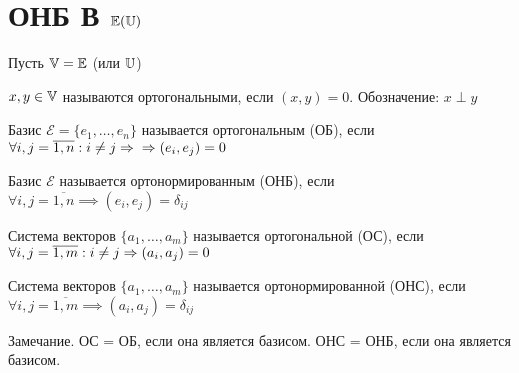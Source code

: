 \documentclass[../main.tex]{subfiles}
\begin{document}
    \section{ОНБ В $\E(\U)$}
Пусть $\V= \E $ (или $\U$)
\begin{definition}
    $x,y\in \V$ называются ортогональными, если $(x,y)= 0$. Обозначение: $x\perp y$
\end{definition}
\begin{definition}
    Базис $\mathcal{E} = \{e_{1},\dots,e_{n}\}$ называется ортогональным (ОБ), если $\forall i,j=\overline{1,n}: i\neq j\implies\\\implies (e_{i},e_{j})=0$
    
\end{definition}
\begin{definition}
    Базис $\mathcal{E}$ называется ортонормированным (ОНБ), если $\forall i,j =\overline{1,n}\implies (e_{i},e_{j})=\delta_{ij}$ 
\end{definition}
\begin{definition}
    Система векторов $\{a_{1},\dots,a_{m}\}$ называется ортогональной (ОС), если $\forall i,j=\overline{1,m}: \\i\neq j \implies (a_{i},a_{j})=0$ 

\end{definition}
\begin{definition}
    Система векторов $\{a_{1},\dots,a_{m}\}$ называется ортонормированной (ОНС), если $\forall i,j=\overline{1,m}\implies (a_{i},a_{j})=\delta_{ij}$ 

\end{definition}


Замечание. ОС = ОБ, если она является базисом. ОНС = ОНБ, если она является базисом. 
\end{document}
